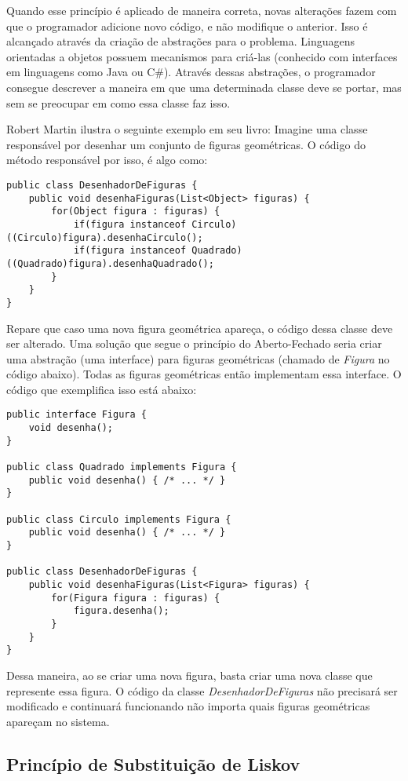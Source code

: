 Quando esse princípio é aplicado de maneira correta, novas alterações fazem com
que o programador adicione novo código, e não modifique o anterior. Isso é
alcançado através da criação de abstrações para o problema. Linguagens
orientadas a objetos possuem mecanismos para criá-las (conhecido com interfaces
em linguagens como Java ou C\#). Através dessas abstrações, o programador consegue 
descrever a maneira em que uma determinada classe deve se portar, mas sem se
preocupar em como essa classe faz isso.

Robert Martin \cite{bob-martin} ilustra o seguinte exemplo em seu livro: Imagine
uma classe responsável por desenhar um conjunto de figuras geométricas. O código
do método responsável por isso, é algo como:

\begin{lstlisting}[frame=trbl]
public class DesenhadorDeFiguras {
	public void desenhaFiguras(List<Object> figuras) {
		for(Object figura : figuras) {
			if(figura instanceof Circulo) ((Circulo)figura).desenhaCirculo();
			if(figura instanceof Quadrado) ((Quadrado)figura).desenhaQuadrado();
		}
	}
}
\end{lstlisting}

Repare que caso uma nova figura geométrica apareça, o código dessa classe deve
ser  alterado. Uma solução que segue o princípio do Aberto-Fechado seria criar 
uma abstração (uma interface) para figuras geométricas (chamado de
\textit{Figura} no código abaixo). Todas as figuras geométricas então
implementam essa interface. O código que exemplifica isso está abaixo:

\begin{lstlisting}[frame=trbl]
public interface Figura {
	void desenha();
}

public class Quadrado implements Figura {
	public void desenha() { /* ... */ }
}

public class Circulo implements Figura {
	public void desenha() { /* ... */ }
}

public class DesenhadorDeFiguras {
	public void desenhaFiguras(List<Figura> figuras) {
		for(Figura figura : figuras) {
			figura.desenha();
		}
	}
}
\end{lstlisting}

Dessa maneira, ao se criar uma nova figura, basta criar uma nova classe que
represente essa figura. O código da classe \textit{DesenhadorDeFiguras} não
precisará ser modificado e continuará funcionando não importa quais figuras
geométricas apareçam no sistema.

\subsection{Princípio de Substituição de Liskov}
\label{subsec:lsp}


